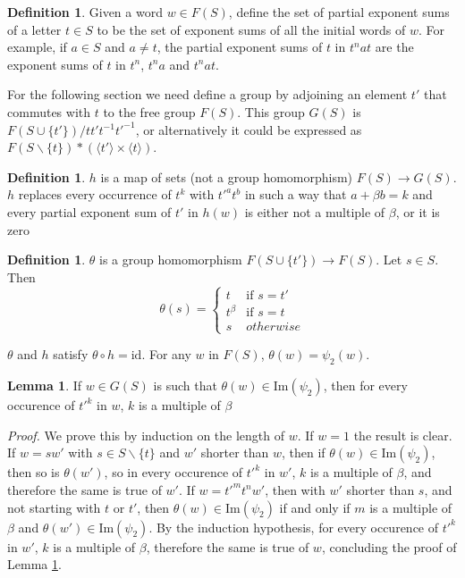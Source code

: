 \documentclass[12pt]{article} %
\theoremstyle{definition}
\theoremstyle{definition}
\theoremstyle{definition}
\newtheorem{lemma}{Lemma}[theorem]
\theoremstyle{definition}
\theoremstyle{definition}
\newtheorem{defn}[theorem]{Definition}
\theoremstyle{definition}
\begin{document}
\begin{defn}
  Given a word $w \in F(S)$, define the set of partial exponent sums of a letter $t \in S$ to
  be the set of exponent sums of all the initial words of $w$. For example, if $a \in S$ and
  $a \ne t$, the partial
  exponent sums of $t$ in $t^n a t$ are the exponent sums of $t$ in
  $t^n$, $t^na$ and $t^nat$.
\end{defn}

For the following section we need define a group by adjoining an element $t'$ that commutes
with $t$ to the free group $F(S)$. This group $G(S)$ is $F(S \cup \{t'\}) / tt't^{-1}t'^{-1}$,
or alternatively it could be expressed as $F(S \backslash \{t\}) \ast
(\langle t' \rangle \times \langle t \rangle)$.

\begin{defn}
  $h$ is a map of sets (not a group homomorphism) $F(S) \to G(S)$.
  $h$ replaces every occurrence of $t^k$ with $t'^at^b$ in such a way that $a + \beta b = k$
  and every partial exponent sum of $t'$ in $h(w)$ is either not a multiple of $\beta$,
  or it is zero
\end{defn}

\begin{defn}
  $\theta$ is a group homomorphism $F(S \cup \{t'\}) \to F(S)$. Let $s \in S$. Then
  \begin{equation}
    \theta(s) = \begin{cases}
      t & \text{if } s = t' \\
      t^\beta & \text{if } s = t \\
      s & otherwise
    \end{cases}
  \end{equation}
\end{defn}

$\theta$ and $h$ satisfy $\theta \circ h = \text{id}$. For any $w$ in $F(S)$,
$\theta(w) = \psi_2(w)$.

\begin{lemma}\label{thetatt'}
  If $w \in G(S)$ is such that $\theta(w) \in \text{Im}(\psi_2)$,
  then for every occurence of $t'^k$ in $w$, $k$ is a multiple of $\beta$
\end{lemma}

\textit{Proof.} We prove this by induction on the length of $w$. If $w=1$ the result is clear.
If $w = sw'$ with $s \in S \backslash \{t\}$ and $w'$ shorter than $w$,
then if $\theta(w) \in \text{Im}(\psi_2)$, then so is $\theta(w')$, so in every occurence
of $t'^k$ in $w'$, $k$ is a multiple of $\beta$, and therefore the same is true of $w'$.
If $w = t'^m t ^ n w'$, then with $w'$ shorter than $s$, and not starting with $t$ or $t'$,
then $\theta(w) \in \text{Im}(\psi_2)$ if and only if $m$ is a multiple of $\beta$ and
$\theta(w') \in \text{Im}(\psi_2)$. By the induction hypothesis, for every occurence of $t'^k$
in $w'$, $k$ is a multiple of $\beta$, therefore the same is true of $w$, concluding the proof
of Lemma \ref{thetatt'}.
\end{document}

